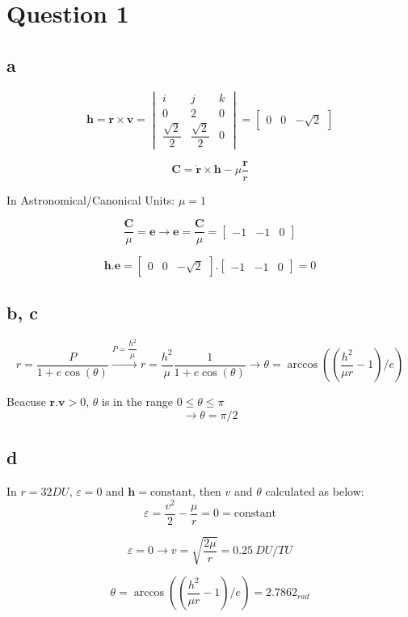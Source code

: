 \section{Question 1}
\subsection{a}
$$
\boldsymbol h = \boldsymbol r \times \boldsymbol v = \begin{vmatrix}
	i & j & k \\
	0 & 2 & 0 \\
	\dfrac{\sqrt{2}}{2} & \dfrac{\sqrt{2}}{2} & 0
\end{vmatrix} = \begin{bmatrix}
	0 & 0 & -\sqrt{2}
\end{bmatrix}
$$

$$
\boldsymbol C = \dot{\boldsymbol{r}} \times \boldsymbol h - \mu \dfrac{\boldsymbol r}{r}
$$

In Astronomical/Canonical Units: $\mu = 1$

$$
\dfrac{\boldsymbol C}{\mu} = \boldsymbol e \to \boldsymbol e = \dfrac{\boldsymbol C}{\mu} = \begin{bmatrix}
	-1 & -1 & 0
\end{bmatrix}
$$

$$
\boldsymbol h . \boldsymbol e =  \begin{bmatrix}
	0 & 0 & -\sqrt{2}
\end{bmatrix} . \begin{bmatrix}
	-1 & -1 & 0
\end{bmatrix} = 0
$$


\subsection{b, c}
$$
r = \dfrac{P}{1+e\cos(\theta)} \xrightarrow{P = \dfrac{h^2}{\mu}} r = \dfrac{h^2}{\mu}  \dfrac{1}{1+e\cos(\theta)} \to \theta = \arccos \left(( \dfrac{h^2}{\mu r} - 1 ) / e \right)
$$

Beacuse $ \boldsymbol r . \boldsymbol v > 0 $, $\theta$ is in the range $0 \leq \theta \leq \pi$
$$
\to \theta = \pi / 2
$$


\subsection{d}
In $ r = 32 DU $, $\varepsilon = 0$ and $\boldsymbol h = \text{constant}$, then $v$ and $\theta$ calculated as below:
$$
\varepsilon = \dfrac{v^2}{2} - \dfrac{\mu}{r} = 0 = \text{constant}
$$

$$
\varepsilon = 0 \to v = \sqrt{\dfrac{2 \mu}{r}} = 0.25~DU/TU
$$

$$
\theta = \arccos \left(( \dfrac{h^2}{\mu r} - 1 ) / e \right) = 2.7862_{rad}
$$



